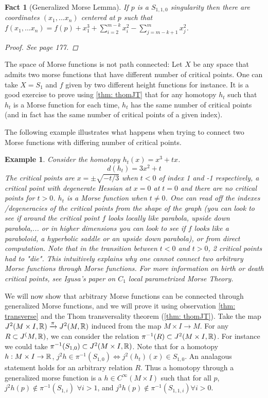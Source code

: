 \documentclass{article}
\newtheorem{fact}[theorem]{Fact}
\newtheorem{example}[theorem]{Example}
\newtheorem{proposed work}[theorem]{Proposed Work}
\begin{document}
\begin{fact}[Generalized Morse Lemma]
If $p$ is a $S_{1,1,0}$ singularity then there are coordinates $(x_1,...x_n)$ centered at $p$ such that $f(x_1,...x_n)=f(p)+x_1^3+\sum_{i=2}^{m-k} x_i^2 -\sum_{j=m-k+1}^m x_j^2$.
\begin{proof}
See \cite{strata} page 177.  
\end{proof}

\end{fact}

The space of Morse functions is not path connected:  Let $X$ be any space that admits two morse functions that have different number of critical points.  One can take $X=S_1$ and $f$ given by two different height functions for instance.  It is a good exercise to prove using \ref{thm: thomJT} that for any homotopy $h_t$ such that $h_t$ is a Morse function for each time, $h_t$ has the same number of critical points (and in fact has the same number of critical points of a given index).

The following example illustrates what happens when trying to connect two Morse functions with differing number of critical points.  
\begin{example}
Consider the homotopy $h_t(x)=x^3+tx$.  \[d(h_t)=3x^2+t\]
The critical points are  $x=\pm  \sqrt{-t/3}$ when $t<0$ of index 1 and -1 respectively,  a critical point with degenerate Hessian at $x=0$ at $t=0$ and there are no critical points for $t>0$.  $h_t$ is a Morse function when $t \neq 0$.  One can read off the indexes /degeneracies of the critical points from the shape of the graph (you can look to see if around the critical point $f$ looks locally like parabola, upside down parabola,... or in higher dimensions you can look to see if $f$ looks like a paraboloid, a hyperbolic saddle or an upside down parabola), or from direct computation.  Note that in the transition between $t<0$ and $t>0$, 2 critical points had to "die".  This intuitively explains why one cannot connect two arbitrary Morse functions through Morse functions. For more information on birth or death critical points, see Igusa's paper on $C_1$ local parametrized Morse Theory.

\end{example}

We will now show that arbitrary Morse functions can be connected through generalized Morse functions, and we will prove it using observation \ref{thm: transverse} and the Thom transversality theorem (\ref{thm: thomJT}).  Take the map $J^2(M \times I, \mathbb R) \xrightarrow{\pi}  J^2(M,\mathbb R)$ induced from the map $M \times I  \to M$. For any $R \subset J^(M, \mathbb R)$, we can consider the relation $\pi^{-1}(R) \subset J^2(M \times I, \mathbb R)$.  For instance we could take $\pi^{-1}( S_{1,0}) \subset J^2(M \times I, \mathbb R)$.  Note that for a homotopy $h: M \times I \to \mathbb R$, $j^2 h \in \pi^{-1}(S_{1,0}) \iff j^2(h_t)(x) \in S_{1,0}$.  An analagous statement holds for an arbitrary relation $R$. Thus a homotopy through a generalized morse function is a $h \in C^\infty(M \times I)$ such that for all $p$,  $j^2 h(p) \notin \pi^{-1}(S_{1,i})$ $\forall i>1$, and $j^3 h(p) \notin \pi^{-1}(S_{1,1,i}) \forall i>0$.
\end{document}
